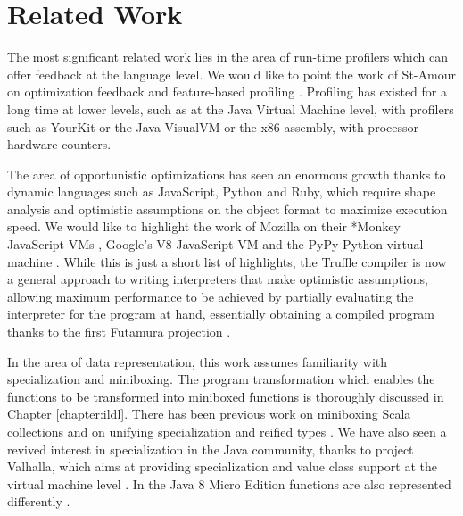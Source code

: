 \section{Related Work}
\label{mbox2:sec:related}



The most significant related work lies in the area of run-time profilers which can offer feedback at the language level. We would like to point the work of St-Amour on optimization feedback \cite{st-amour-opt-coaching} and feature-based profiling \cite{st-amour-feature-specific-profiling}. Profiling has existed for a long time at lower levels, such as at the Java Virtual Machine level, with profilers such as YourKit \cite{yourkit} or the Java VisualVM \cite{visualvm} or the x86 assembly, with processor hardware counters.

The area of opportunistic optimizations has seen an enormous growth thanks to dynamic languages such as JavaScript, Python and Ruby, which require shape analysis and optimistic assumptions on the object format to maximize execution speed. We would like to highlight the work of Mozilla on their *Monkey JavaScript VMs \cite{tracemonkey}, Google's V8 JavaScript VM and the PyPy Python virtual machine \cite{bolz-pypy-tracing-jit,bolz-python-strategies}. While this is just a short list of highlights, the Truffle compiler \cite{truffle,graal} is now a general approach to writing interpreters that make optimistic assumptions, allowing maximum performance to be achieved by partially evaluating the interpreter for the program at hand, essentially obtaining a compiled program thanks to the first Futamura projection \cite{futamura-projection}.

In the area of data representation, this work assumes familiarity with specialization \cite{iuli-thesis} and miniboxing. The program transformation which enables the functions to be transformed into miniboxed functions is thoroughly discussed in Chapter \ref{chapter:ildl}. There has been previous work on miniboxing Scala collections \cite{miniboxing-linkedlist,biboudis-streams,nicolas-rrbvectors} and on unifying specialization and reified types \cite{bridging}. We have also seen a revived interest in specialization in the Java community, thanks to project Valhalla, which aims at providing specialization and value class support at the virtual machine level \cite{rose-value-classes-tearing, goetz-specialization}. In the Java 8 Micro Edition functions are also represented differently \cite{j2me-functions}.


